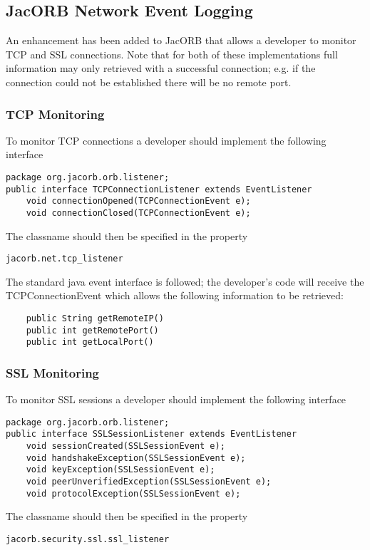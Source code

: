 {{\subsection{JacORB Network Event Logging}
\label{eventLogging}

An enhancement has been added to JacORB that allows a developer to monitor TCP and SSL connections. Note that for both of these implementations full information may only retrieved with a successful connection; e.g. if the connection could not be established there will be no remote port.

\subsubsection{TCP Monitoring}

To monitor TCP connections a developer should implement the following interface
\begin{small}
\begin{verbatim}
package org.jacorb.orb.listener;
public interface TCPConnectionListener extends EventListener
    void connectionOpened(TCPConnectionEvent e);
    void connectionClosed(TCPConnectionEvent e);
\end{verbatim}
\end{small}
The classname should then be specified in the property
\begin{verbatim}
jacorb.net.tcp_listener
\end{verbatim}

The standard java event interface is followed; the developer's code will receive the
TCPConnectionEvent which allows the following information to be retrieved:
\begin{small}
\begin{verbatim}
    public String getRemoteIP()
    public int getRemotePort()
    public int getLocalPort()
\end{verbatim}
\end{small}

\subsubsection{SSL Monitoring}

To monitor SSL sessions a developer should implement the following interface
\begin{small}
\begin{verbatim}
package org.jacorb.orb.listener;
public interface SSLSessionListener extends EventListener
    void sessionCreated(SSLSessionEvent e);
    void handshakeException(SSLSessionEvent e);
    void keyException(SSLSessionEvent e);
    void peerUnverifiedException(SSLSessionEvent e);
    void protocolException(SSLSessionEvent e);
\end{verbatim}
\end{small}
The classname should then be specified in the property
\begin{verbatim}
jacorb.security.ssl.ssl_listener
\end{verbatim}

}}
